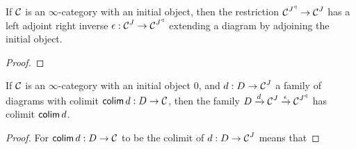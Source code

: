 \begin{lem}\label{lem:kan.extending.cone.adds.initial}
If $\operatorname{\mathcal{C}}$ is an $\infty$-category with an initial object, then the restriction
$\operatorname{\mathcal{C}}^{J^{\triangleleft}} \to \operatorname{\mathcal{C}}^{J}$ has a left adjoint right inverse $\epsilon
: \operatorname{\mathcal{C}}^J \to \operatorname{\mathcal{C}}^{J^{\triangleleft}}$ extending a diagram by adjoining the
initial object. 
\end{lem}
\begin{proof}

\end{proof}


\begin{lem}\label{lem:extending.diagram.with.initial.object.has.same.colimit}
If $\operatorname{\mathcal{C}}$ is an $\infty$-category with an initial object $0$, and $d : D \to
\operatorname{\mathcal{C}}^J$ a family of diagrams with colimit $\operatorname{\mathsf{colim}} d : D \to \operatorname{\mathcal{C}}$, then the family
$D \xrightarrow{d} \operatorname{\mathcal{C}}^J \xrightarrow{\epsilon} \operatorname{\mathcal{C}}^{J^{\triangleleft}}$ has colimit $\operatorname{\mathsf{colim}} d$.
\end{lem}
\begin{proof}
For $\operatorname{\mathsf{colim}} d : D \to \operatorname{\mathcal{C}}$ to be the colimit of $d : D \to \operatorname{\mathcal{C}}^J$ means that 
\end{proof}


